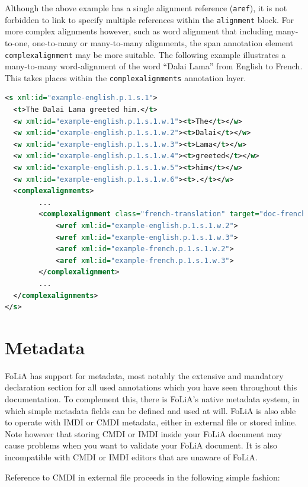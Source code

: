 \documentclass[a4paper,12pt]{report}
\begin{document}
Although the above example has a single alignment reference (\texttt{aref}), it is not forbidden to link to specify multiple references within the \texttt{alignment} block. For more complex alignments however, such as word alignment that including many-to-one, one-to-many or many-to-many alignments, the span annotation element \texttt{complexalignment} may be more suitable. The following example illustrates a many-to-many word-alignment of the word ``Dalai Lama'' from English to French. This takes places within the \texttt{complexalignments} annotation layer.

\begin{lstlisting}[language=xml]
<s xml:id="example-english.p.1.s.1">
  <t>The Dalai Lama greeted him.</t>
  <w xml:id="example-english.p.1.s.1.w.1"><t>The</t></w>
  <w xml:id="example-english.p.1.s.1.w.2"><t>Dalai</t></w>
  <w xml:id="example-english.p.1.s.1.w.3"><t>Lama</t></w>
  <w xml:id="example-english.p.1.s.1.w.4"><t>greeted</t></w>
  <w xml:id="example-english.p.1.s.1.w.5"><t>him</t></w>
  <w xml:id="example-english.p.1.s.1.w.6"><t>.</t></w>
  <complexalignments>
        ...
        <complexalignment class="french-translation" target="doc-french.xml">
            <wref xml:id="example-english.p.1.s.1.w.2">
            <wref xml:id="example-english.p.1.s.1.w.3">
            <aref xml:id="example-french.p.1.s.1.w.2">
            <aref xml:id="example-french.p.1.s.1.w.3">
        </complexalignment>
        ...
  </complexalignments>
</s>
\end{lstlisting}




\section{Metadata}

FoLiA has support for metadata, most notably the extensive and mandatory declaration section for all used annotations which you have seen throughout this documentation. To complement this, there is FoLiA's native metadata system, in which simple metadata fields can be defined and used at will. FoLiA is also able to operate with IMDI or CMDI metadata, either in external file or stored inline. Note however that storing CMDI or IMDI inside your FoLiA document may cause problems when you want to validate your FoLiA document. It is also incompatible with CMDI or IMDI editors that are unaware of FoLiA.

Reference to CMDI in external file proceeds in the following simple fashion:
\end{document}
